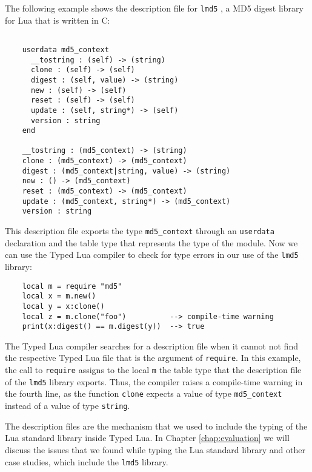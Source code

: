 The following example shows the description file for \texttt{lmd5} \citep{lmd5},
a MD5 digest library for Lua that is written in C:
\begin{verbatim}

    userdata md5_context
      __tostring : (self) -> (string)
      clone : (self) -> (self)
      digest : (self, value) -> (string)
      new : (self) -> (self)
      reset : (self) -> (self)
      update : (self, string*) -> (self)
      version : string
    end

    __tostring : (md5_context) -> (string)
    clone : (md5_context) -> (md5_context)
    digest : (md5_context|string, value) -> (string)
    new : () -> (md5_context)
    reset : (md5_context) -> (md5_context)
    update : (md5_context, string*) -> (md5_context)
    version : string
\end{verbatim}

This description file exports the type \texttt{md5\string_context}
through an \texttt{userdata} declaration and the table type that
represents the type of the module.
Now we can use the Typed Lua compiler to check for type errors in
our use of the \texttt{lmd5} library:
\begin{verbatim}
    local m = require "md5"
    local x = m.new()
    local y = x:clone()
    local z = m.clone("foo")          --> compile-time warning
    print(x:digest() == m.digest(y))  --> true
\end{verbatim}

The Typed Lua compiler searches for a
description file when it cannot not find the respective Typed Lua file
that is the argument of \texttt{require}.
In this example, the call to \texttt{require} assigns to the local
\texttt{m} the table type that the description file of the \texttt{lmd5}
library exports. 
Thus, the compiler raises a compile-time warning in the fourth line,
as the function \texttt{clone} expects a value of type
\texttt{md5\string_context} instead of a value of type \texttt{string}.

The description files are the mechanism that we used to include the
typing of the Lua standard library inside Typed Lua.
In Chapter \ref{chap:evaluation} we will discuss the issues that we
found while typing the Lua standard library and other case studies,
which include the \texttt{lmd5} library. 


